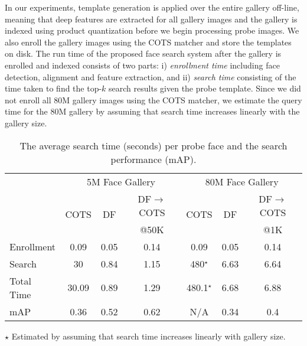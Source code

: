 \documentclass[10pt,journal,compsoc]{IEEEtran}
\begin{document}
In our experiments, template generation is applied over the entire gallery off-line, meaning that deep features are extracted for all gallery images and the gallery is indexed using product quantization before we begin processing probe images. We also enroll the gallery images using the COTS matcher and store the templates on disk. The run time of the proposed face search system after the gallery is enrolled and indexed consists of two parts: i) \emph{enrollment time} including face detection, alignment and feature extraction, and ii) \emph{search time} consisting of the time taken to find the top-$k$ search results given the probe template. Since we did not enroll all $80$M gallery images using the COTS matcher, we estimate the query time for the $80$M gallery by assuming that search time increases linearly with the gallery size.
\begin{table}[]
\scriptsize
\centering
\begin{threeparttable}[b]
\caption{The average search time (seconds) per probe face and the search performance (mAP).}\label{tab:running_time}
\begin{tabular}{l|ccc|ccc}
\toprule
               & \multicolumn{3}{c|}{5M Face Gallery} & \multicolumn{3}{c}{80M Face Gallery} \\ \cmidrule{2-7}
               & \multirow{2}{*}{COTS}   & \multirow{2}{*}{DF}   & {\scriptsize DF$\rightarrow$COTS} & \multirow{2}{*}{COTS}   & \multirow{2}{*}{DF}    & {\scriptsize DF$\rightarrow$COTS} \\
               & & & {\scriptsize @50K} & & & {\scriptsize @1K} \\ \midrule
Enrollment     & 0.09   & 0.05 & 0.14                & 0.09   & 0.05  & 0.14                \\
Search      & 30     & 0.84 & 1.15                & 480$^\star$    & 6.63  & 6.64                \\
Total Time     & 30.09  & 0.89 & 1.29                & 480.1$^\star$  & 6.68  & 6.88                \\ \cmidrule{1-1}
mAP            & 0.36   & 0.52 & 0.62                & N/A    & 0.34  & 0.4                 \\ \bottomrule
\end{tabular}
\begin{tablenotes}
    \item[$\star$]Estimated by assuming that search time increases linearly with gallery size.
\end{tablenotes}
\end{threeparttable}
\end{table}
\end{document}

